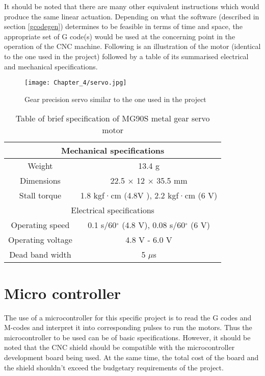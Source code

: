 It should be noted that there are many other equivalent instructions which would produce the same linear actuation. Depending on what the software (described in section \ref{gcodegen}) determines to be feasible in terms of time and space, the appropriate set of G code(s) would be used at the concerning point in the operation of the CNC machine. Following is an illustration of the motor (identical to the one used in the project) followed by a table of its summarised electrical and mechanical specifications.

\begin{figure}[h]
 \centering
 \texttt{[image: Chapter\_4/servo.jpg]}
 \caption{Gear precision servo similar to the one used in the project}
 \label{fig:servo}
\end{figure}

\begin{table}[h]
 \def\arraystretch{1.5}
 \centering
 \caption{Table of brief specification of MG90S metal gear servo motor}
 \begin{tabular}{|c|c|}
  \hline
  \multicolumn{2}{|c|}{Mechanical specifications}                           \\
  \hline
  Weight            & 13.4 g                                                \\
  \hline
  Dimensions        & 22.5 $\times$ 12 $\times$ 35.5 mm                     \\
  \hline
  Stall torque      & 1.8 kgf·cm (4.8V ), 2.2 kgf·cm (6 V)                  \\
  \hline
  \multicolumn{2}{|c|}{Electrical specifications}                           \\
  \hline
  Operating speed   & 0.1 s/60$^{\circ}$ (4.8 V), 0.08 s/60$^{\circ}$ (6 V) \\
  \hline
  Operating voltage & 4.8 V - 6.0 V                                         \\
  \hline
  Dead band width   & 5 $\mu$s                                              \\
  \hline
 \end{tabular}
 \label{tab:servo_specs}
\end{table}


\section{Micro controller}

The use of a microcontroller \cite{arduino_ref} for this specific project is to read the G codes and M-codes and interpret it into corresponding pulses to run the motors. Thus the microcontroller to be used can be of basic specifications. However, it should be noted that the CNC shield should be compatible with the microcontroller development board being used. At the same time, the total cost of the board and the shield shouldn’t exceed the budgetary requirements of the project. \par

